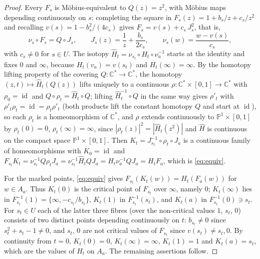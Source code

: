 \documentclass[12pt]{article}
\newcommand{\Pone}{\mathbb P^1}
\newcommand{\C}{\mathbb C}
\newcommand{\id}{\operatorname{id}}
\theoremstyle{remark}
\numberwithin{equation}{section}
\begin{document}
\begin{proof}
Every $F_s$ is M\"obius-equivalent to $Q(z)=z^2$, with M\"obius maps
depending continuously on $s$: completing the square in
$F_s(z)=1+b_s/z+c_s/z^2$ and recalling $v(s)=1-b_s^2/(4c_s)$ gives
$F_s=v(s)+c_s\,J_s^2$, that is,
\[
 \nu_s\circ F_s=Q\circ J_s,\qquad
 J_s(z)=\frac1z+\frac{b_s}{2c_s},\qquad \nu_s(w)=\frac{w-v(s)}{c_s},
\]
with $c_s\ne0$ for $s\in U$. The isotopy
$\widehat H_t=\nu_{s_t}\circ H_t\circ \nu_a^{-1}$ starts at the identity
and fixes $0$ and $\infty$, because $H_t(v_a)=v(s_t)$ and
$H_t(\infty)=\infty$. By the homotopy lifting property of the covering
$Q\colon\C^*\to\C^*$, the homotopy $(z,t)\mapsto\widehat H_t(Q(z))$ lifts
uniquely to a continuous $\rho\colon\C^*\times[0,1]\to\C^*$ with
$\rho_0=\id$ and $Q\circ\rho_t=\widehat H_t\circ Q$; lifting
$\widehat H_t^{-1}\circ Q$ in the same way gives $\rho'_t$ with
$\rho'_t\rho_t=\id=\rho_t\rho'_t$ (both products lift the constant
homotopy $Q$ and start at $\id$), so each $\rho_t$ is a homeomorphism of
$\C^*$, and $\rho$ extends continuously to $\Pone\times[0,1]$ by
$\rho_t(0)=0$, $\rho_t(\infty)=\infty$, since
$|\rho_t(z)|^2=|\widehat H_t(z^2)|$ and $\widehat H$ is continuous on the
compact space $\Pone\times[0,1]$. Then
$K_t=J_{s_t}^{-1}\circ\rho_t\circ J_a$ is a continuous family of
homeomorphisms with $K_0=\id$ and
$F_{s_t}K_t=\nu_{s_t}^{-1}Q\rho_tJ_a=\nu_{s_t}^{-1}\widehat H_tQJ_a
=H_t\nu_a^{-1}QJ_a=H_tF_a$, which is \eqref{eq:equiv}.

For the marked points, \eqref{eq:equiv} gives
$F_{s_t}(K_t(w))=H_t(F_a(w))$ for $w\in A_a$. Thus $K_t(0)$ is the critical
point of $F_{s_t}$ over $\infty$, namely $0$; $K_t(\infty)$ lies in
$F_{s_t}^{-1}(1)=\{\infty,-c_{s_t}/b_{s_t}\}$, $K_t(1)$ in
$F_{s_t}^{-1}(s_t)$, and $K_t(a)$ in $F_{s_t}^{-1}(0)\ni s_t$. For $s_t\in U$ each of the latter three fibres
(over the non-critical values $1$, $s_t$, $0$) consists of
two distinct points depending continuously on $t$: $b_{s_t}\ne0$ since
$s_t^2+s_t-1\ne0$, and $s_t$, $0$ are not critical values of $F_{s_t}$
since $v(s_t)\ne s_t,0$. By continuity from $t=0$,
$K_t(0)=0$, $K_t(\infty)=\infty$, $K_t(1)=1$ and $K_t(a)=s_t$, which are
the values of $H_t$ on $A_a$. The remaining assertions follow.
\end{proof}
\end{document}
